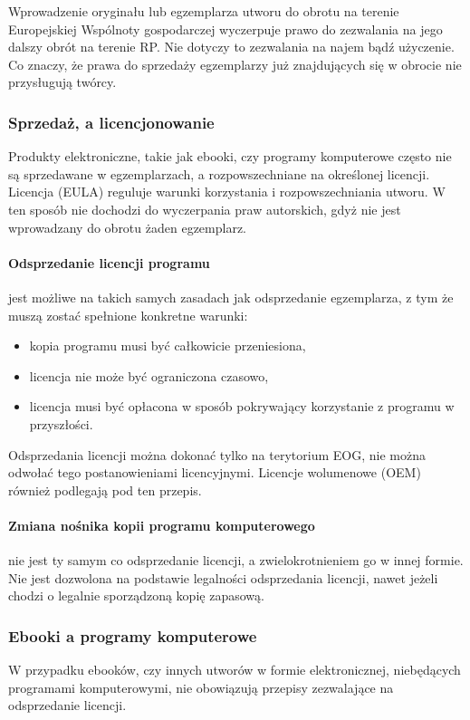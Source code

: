 \documentclass{article}
\begin{document}
Wprowadzenie oryginału lub egzemplarza utworu do obrotu na terenie Europejskiej Wspólnoty gospodarczej wyczerpuje prawo do zezwalania na jego dalszy obrót na terenie RP. Nie dotyczy to zezwalania na najem bądź użyczenie.
Co znaczy, że prawa do sprzedaży egzemplarzy już znajdujących się w obrocie nie przysługują twórcy.

\subsubsection{Sprzedaż, a licencjonowanie}

Produkty elektroniczne, takie jak ebooki, czy programy komputerowe często nie są sprzedawane w egzemplarzach, a rozpowszechniane na określonej licencji. Licencja (EULA) reguluje warunki korzystania i rozpowszechniania utworu. W ten sposób nie dochodzi do wyczerpania praw autorskich, gdyż nie jest wprowadzany do obrotu żaden egzemplarz.

\paragraph{Odsprzedanie licencji programu}

jest możliwe na takich samych zasadach jak odsprzedanie egzemplarza, z tym że muszą zostać spełnione konkretne warunki:
\begin{itemize}
  \item kopia programu musi być całkowicie przeniesiona,
  \item licencja nie może być ograniczona czasowo,
  \item licencja musi być opłacona w sposób pokrywający korzystanie z programu w przyszłości.
\end{itemize}
Odsprzedania licencji można dokonać tylko na terytorium EOG, nie można odwołać tego postanowieniami licencyjnymi. Licencje wolumenowe (OEM) również podlegają pod ten przepis.

\paragraph{Zmiana nośnika kopii programu komputerowego}

nie jest ty samym co odsprzedanie licencji, a zwielokrotnieniem go w innej formie. Nie jest dozwolona na podstawie legalności odsprzedania licencji, nawet jeżeli chodzi o legalnie sporządzoną kopię zapasową.

\subsubsection{Ebooki a programy komputerowe}

W przypadku ebooków, czy innych utworów w formie elektronicznej, niebędących programami komputerowymi, nie obowiązują przepisy zezwalające na odsprzedanie licencji.
\end{document}

